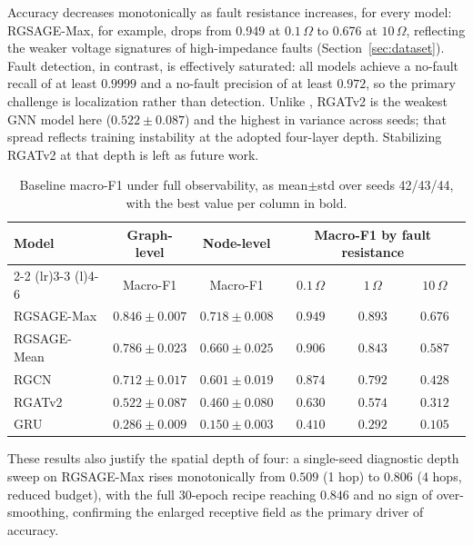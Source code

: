 \documentclass[3p,times,procedia]{elsarticle}
\begin{document}
Accuracy decreases monotonically as fault resistance increases, for every model: RGSAGE-Max, for example, drops from 0.949 at $0.1\,\Omega$ to 0.676 at $10\,\Omega$, reflecting the weaker voltage signatures of high-impedance faults (Section~\ref{sec:dataset}). Fault detection, in contrast, is effectively saturated: all models achieve a no-fault recall of at least $0.9999$ and a no-fault precision of at least $0.972$, so the primary challenge is localization rather than detection. Unlike \cite{Karabulut2026}, RGATv2 is the weakest GNN model here ($0.522\pm0.087$) and the highest in variance across seeds; that spread reflects training instability at the adopted four-layer depth. Stabilizing RGATv2 at that depth is left as future work.

\begin{table}[!tb]
\centering
\caption{Baseline macro-F1 under full observability, as mean$\pm$std over seeds 42/43/44, with the best value per column in bold.}

\label{tab:baseline}
\footnotesize
\begin{tabular}{@{}lccccc@{}}
\toprule
\multirow{2}{*}{Model} &
\multicolumn{1}{c}{Graph-level} &
\multicolumn{1}{c}{Node-level} &
\multicolumn{3}{c}{Macro-F1 by fault resistance} \\
\cmidrule(lr){2-2}
\cmidrule(lr){3-3}
\cmidrule(l){4-6}
&
Macro-F1 &
Macro-F1 &
$0.1\,\Omega$ &
$1\,\Omega$ &
$10\,\Omega$ \\
\midrule
RGSAGE-Max
& $\mathbf{0.846 \pm 0.007}$
& $\mathbf{0.718 \pm 0.008}$
& $\mathbf{0.949}$
& $\mathbf{0.893}$
& $\mathbf{0.676}$ \\

RGSAGE-Mean
& $0.786 \pm 0.023$
& $0.660 \pm 0.025$
& $0.906$
& $0.843$
& $0.587$ \\

RGCN
& $0.712 \pm 0.017$
& $0.601 \pm 0.019$
& $0.874$
& $0.792$
& $0.428$ \\

RGATv2
& $0.522 \pm 0.087$
& $0.460 \pm 0.080$
& $0.630$
& $0.574$
& $0.312$ \\

GRU
& $0.286 \pm 0.009$
& $0.150 \pm 0.003$
& $0.410$
& $0.292$
& $0.105$ \\
\bottomrule
\end{tabular}
\end{table}

These results also justify the spatial depth of four: a single-seed diagnostic depth sweep on RGSAGE-Max rises monotonically from $0.509$ (1 hop) to $0.806$ (4 hops, reduced budget), with the full 30-epoch recipe reaching $0.846$ and no sign of over-smoothing, confirming the enlarged receptive field as the primary driver of accuracy.
\end{document}
